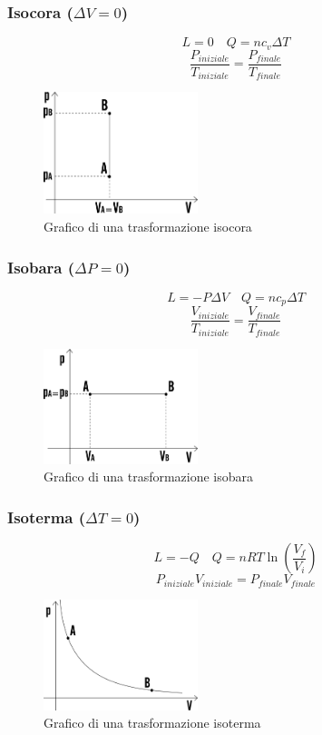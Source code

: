 \documentclass[a4paper]{article}
\theoremstyle{break}
\theoremstyle{break}
\theoremstyle{break}
\theoremstyle{break}
\begin{document}
\subsubsection{Isocora (\( \Delta V = 0 \))}
\[
L = 0 \quad Q = n c_v \Delta T
\] 
\[
  \frac{P_{iniziale}}{T_{iniziale}} = \frac{P_{finale}}{T_{finale}}
\] 
\begin{figure}[H]
  \begin{center}
    \includegraphics[width=0.4\textwidth]{isocora}
  \end{center}
  \caption{Grafico di una trasformazione isocora}
\end{figure}


\subsubsection{Isobara (\( \Delta P = 0 \))}
\[
L = -P \Delta V \quad Q = n c_p \Delta T
\] 
\[
  \frac{V_{iniziale}}{T_{iniziale}} = \frac{V_{finale}}{T_{finale}}
\] 
\begin{figure}[H]
  \begin{center}
    \includegraphics[width=0.4\textwidth]{isobara}
  \end{center}
  \caption{Grafico di una trasformazione isobara}
\end{figure}

\subsubsection{Isoterma (\( \Delta T = 0 \))}
\[
L = -Q \quad Q = n R T \ln \left( \frac{V_f}{V_i} \right)
\] 
\[
  P_{iniziale} V_{iniziale} = P_{finale} V_{finale}
\] 
\begin{figure}[H]
  \begin{center}
    \includegraphics[width=0.4\textwidth]{isoterma}
  \end{center}
  \caption{Grafico di una trasformazione isoterma}
\end{figure}
\end{document}
